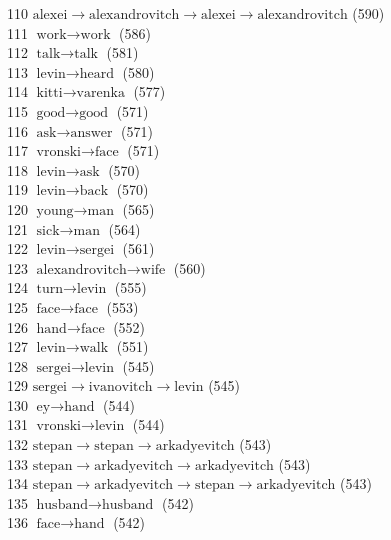 \begin{appendices}
   110  $ \text{alexei} \to \text{alexandrovitch} \to \text{alexei} \to \text{alexandrovitch} $ (590) \\
   111  $ \text{work} \to \text{work} $ (586) \\
   112  $ \text{talk} \to \text{talk} $ (581) \\
   113  $ \text{levin} \to \text{heard} $ (580) \\
   114  $ \text{kitti} \to \text{varenka} $ (577) \\
   115  $ \text{good} \to \text{good} $ (571) \\
   116  $ \text{ask} \to \text{answer} $ (571) \\
   117  $ \text{vronski} \to \text{face} $ (571) \\
   118  $ \text{levin} \to \text{ask} $ (570) \\
   119  $ \text{levin} \to \text{back} $ (570) \\
   120  $ \text{young} \to \text{man} $ (565) \\
   121  $ \text{sick} \to \text{man} $ (564) \\
   122  $ \text{levin} \to \text{sergei} $ (561) \\
   123  $ \text{alexandrovitch} \to \text{wife} $ (560) \\
   124  $ \text{turn} \to \text{levin} $ (555) \\
   125  $ \text{face} \to \text{face} $ (553) \\
   126  $ \text{hand} \to \text{face} $ (552) \\
   127  $ \text{levin} \to \text{walk} $ (551) \\
   128  $ \text{sergei} \to \text{levin} $ (545) \\
   129  $ \text{sergei} \to \text{ivanovitch} \to \text{levin} $ (545) \\
   130  $ \text{ey} \to \text{hand} $ (544) \\
   131  $ \text{vronski} \to \text{levin} $ (544) \\
   132  $ \text{stepan} \to \text{stepan} \to \text{arkadyevitch} $ (543) \\
   133  $ \text{stepan} \to \text{arkadyevitch} \to \text{arkadyevitch} $ (543) \\
   134  $ \text{stepan} \to \text{arkadyevitch} \to \text{stepan} \to \text{arkadyevitch} $ (543) \\
   135  $ \text{husband} \to \text{husband} $ (542) \\
   136  $ \text{face} \to \text{hand} $ (542) \\

\end{appendices}
